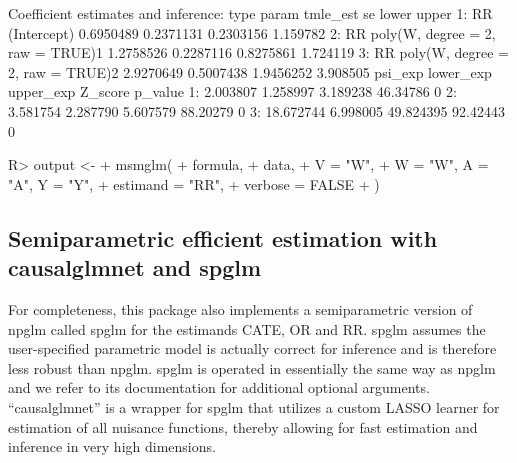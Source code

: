 \documentclass[
]{jss}
\begin{document}
\begin{CodeChunk}
\begin{CodeOutput}
Coefficient estimates and inference:
   type                            param  tmle_est        se     lower    upper
1:   RR                      (Intercept) 0.6950489 0.2371131 0.2303156 1.159782
2:   RR poly(W, degree = 2, raw = TRUE)1 1.2758526 0.2287116 0.8275861 1.724119
3:   RR poly(W, degree = 2, raw = TRUE)2 2.9270649 0.5007438 1.9456252 3.908505
     psi_exp lower_exp upper_exp  Z_score p_value
1:  2.003807  1.258997  3.189238 46.34786       0
2:  3.581754  2.287790  5.607579 88.20279       0
3: 18.672744  6.998005 49.824395 92.42443       0
\end{CodeOutput}
\begin{CodeInput}
R> output <-
+   msmglm(
+     formula,
+     data,
+     V = "W",
+     W = "W", A = "A", Y = "Y",
+     estimand = "RR",
+     verbose = FALSE
+   )
\end{CodeInput}
\end{CodeChunk}

\hypertarget{semiparametric-efficient-estimation-with-causalglmnet-and-spglm}{%
\subsection{Semiparametric efficient estimation with causalglmnet and
spglm}\label{semiparametric-efficient-estimation-with-causalglmnet-and-spglm}}

For completeness, this package also implements a semiparametric version
of npglm called spglm for the estimands CATE, OR and RR. spglm assumes
the user-specified parametric model is actually correct for inference
and is therefore less robust than npglm. spglm is operated in
essentially the same way as npglm and we refer to its documentation for
additional optional arguments. ``causalglmnet'' is a wrapper for spglm
that utilizes a custom LASSO learner for estimation of all nuisance
functions, thereby allowing for fast estimation and inference in very
high dimensions.
\end{document}
